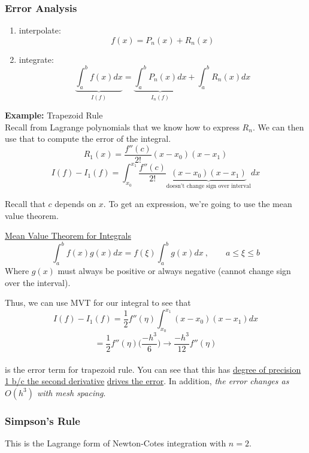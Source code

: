 \documentclass[12pt, answers]{exam}
\begin{document}
\subsubsection*{Error Analysis}
\begin{enumerate}
\item interpolate:
\[f(x) = P_n(x) + R_n(x)\]
\item integrate:
\[\underbrace{\int_a^b f(x) dx}_{I(f)} = \underbrace{\int_a^b P_n(x)dx}_{I_n(f)} + \int_a^b R_n(x) dx\]
\end{enumerate}

\textbf{Example:} Trapezoid Rule\\
Recall from Lagrange polynomials that we know how to express $R_n$. We can then use that to compute the error of the integral.
\[
R_1(x) = \frac{f''(c)}{2!}(x-x_0)(x-x_1) \]
\ifprintanswers
\[
I(f) - I_1(f) = \int_{x_0}^{x_1} \frac{f''(c)}{2!}\underbrace{(x-x_0)(x-x_1)}_{\text{doesn't change sign over interval}} dx\]
\else
\vspace*{2em}
\fi

%
Recall that $c$ depends on $x$. To get an expression, we're going to use the mean value theorem.

\underline{Mean Value Theorem for Integrals}\\
\[\int_a^b f(x)g(x)dx = f(\xi) \int_a^b g(x)dx\:, \qquad a\leq \xi \leq b\]
Where $g(x)$ must always be positive or always negative (cannot change sign over the interval).

Thus, we can use MVT for our integral to see that
\[
I(f) - I_1(f) = \frac{1}{2}f''(\eta) \int_{x_0}^{x_1} (x-x_0)(x-x_1) dx \]
\ifprintanswers
\[= \frac{1}{2}f''(\eta) \bigl(\frac{-h^3}{6}\bigr) \rightarrow \boxed{\frac{-h^3}{12}f''(\eta)}\]
\else
\vspace*{2em}\\
\fi
is the error term for trapezoid rule. You can see that this has \underline{degree of precision 1 b/c the second derivative} \underline{drives the error}. In addition, \textit{the error changes as $O(h^3)$ with mesh spacing}.


\vspace*{-1em}
\subsubsection*{Simpson's Rule}
This is the Lagrange form of Newton-Cotes integration with $n=2$.
\end{document}
